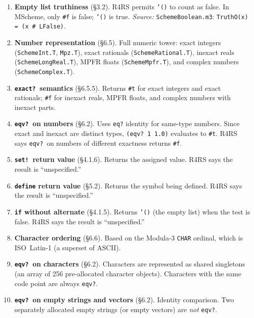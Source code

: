 \documentclass[12pt]{report}
\begin{document}
\begin{enumerate}[label=\textbf{\arabic*.}, leftmargin=3em]

\item \textbf{Empty list truthiness} (\S3.2).
  R4RS permits {\tt '()} to count as false.  In MScheme, only {\tt \#f}
  is false; {\tt '()} is true.
  \emph{Source:} {\tt SchemeBoolean.m3}: {\tt TruthO(x) = (x \# LFalse)}.

\item \textbf{Number representation} (\S6.5).
  Full numeric tower: exact integers ({\tt SchemeInt.T}, {\tt Mpz.T}),
  exact rationals ({\tt SchemeRational.T}), inexact reals
  ({\tt SchemeLongReal.T}), MPFR floats ({\tt SchemeMpfr.T}),
  and complex numbers ({\tt SchemeComplex.T}).

\item \textbf{{\tt exact?}\ semantics} (\S6.5.5).
  Returns {\tt \#t} for exact integers and exact rationals;
  {\tt \#f} for inexact reals, MPFR floats, and complex numbers
  with inexact parts.

\item \textbf{{\tt eqv?}\ on numbers} (\S6.2).
  Uses {\tt eq?} identity for same-type numbers.  Since exact and
  inexact are distinct types, {\tt (eqv?\ 1\ 1.0)} evaluates to
  {\tt \#t}.  R4RS says {\tt eqv?}\ on numbers of different exactness
  returns {\tt \#f}.

\item \textbf{{\tt set!}\ return value} (\S4.1.6).
  Returns the assigned value.  R4RS says the result is ``unspecified.''

\item \textbf{{\tt define} return value} (\S5.2).
  Returns the symbol being defined.  R4RS says the result is ``unspecified.''

\item \textbf{{\tt if} without alternate} (\S4.1.5).
  Returns {\tt '()} (the empty list) when the test is false.  R4RS says
  the result is ``unspecified.''

\item \textbf{Character ordering} (\S6.6).
  Based on the Modula-3 {\tt CHAR} ordinal, which is ISO~Latin-1
  (a superset of ASCII).

\item \textbf{{\tt eqv?}\ on characters} (\S6.2).
  Characters are represented as shared singletons (an array of 256
  pre-allocated character objects).  Characters with the same code point
  are always {\tt eqv?}.

\item \textbf{{\tt eqv?}\ on empty strings and vectors} (\S6.2).
  Identity comparison.  Two separately allocated empty strings (or
  empty vectors) are \emph{not} {\tt eqv?}.


\end{enumerate}
\end{document}
